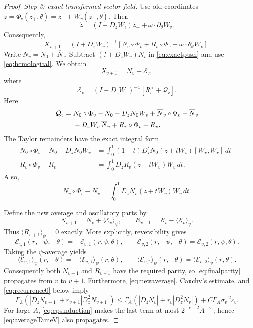 \documentclass[11pt]{amsart}
\theoremstyle{remark}
\newcommand{\eps}{\varepsilon}
\newcommand{\av}[1]{\langle #1\rangle}
\begin{document}
\begin{proof}
\smallskip
\noindent\emph{Step 3: exact transformed vector field.}
Use old coordinates $z=\Phi_v(z_+,\theta)=z_++W_v(z_+,\theta)$.
Then
\[
 \dot z=(I+D_zW_v)\dot z_+
       +\omega\cdot\partial_\theta W_v.
\]
Consequently,
\begin{equation}\label{eq:exactpush}
 X_{v+1}
 =(I+D_zW_v)^{-1}
 \left[
 N_v\circ\Phi_v+R_v\circ\Phi_v
 -\omega\cdot\partial_\theta W_v
 \right].
\end{equation}
Write $N_v=N_0+\overline N_v$.  Subtract
$(I+D_zW_v)N_v$ in \eqref{eq:exactpush} and use
\eqref{eq:homological}.  We obtain
\begin{equation}\label{eq:pushsplit}
 X_{v+1}
 =N_v+\mathcal E_v,
\end{equation}
where
\begin{equation}\label{eq:Ev}
 \mathcal E_v
 =(I+D_zW_v)^{-1}
 \left[
 R_v^>+\mathcal Q_v
 \right].
\end{equation}
Here
\begin{align}
 \mathcal Q_v={}&
 N_0\circ\Phi_v-N_0-D_zN_0W_v
 +\overline N_v\circ\Phi_v-\overline N_v
\notag\\
&-D_zW_v\,\overline N_v
 +R_v\circ\Phi_v-R_v .
\label{eq:Qv}
\end{align}
The Taylor remainders have the exact integral form
\begin{align}
 N_0\circ\Phi_v-N_0-D_zN_0W_v
 &=\int_0^1(1-t)
 D_z^2N_0(z+tW_v)[W_v,W_v]\,dt,
 \label{eq:TaylorN}\\
 R_v\circ\Phi_v-R_v
 &=\int_0^1
 D_zR_v(z+tW_v)W_v\,dt.
\label{eq:TaylorR}
\end{align}
Also,
\begin{equation}\label{eq:TaylorAverage}
 \overline N_v\circ\Phi_v-\overline N_v
 =\int_0^1D_z\overline N_v(z+tW_v)W_v\,dt.
\end{equation}

Define the new average and oscillatory parts by
\begin{equation}\label{eq:newaverage}
 N_{v+1}=N_v+\av{\mathcal E_v}_{\psi},\qquad
 R_{v+1}=\mathcal E_v-\av{\mathcal E_v}_{\psi}.
\end{equation}
Thus $\av{R_{v+1}}_{\psi}=0$ exactly.  More explicitly, reversibility gives
\[
 \mathcal E_{v,1}(r,-\psi,-\theta)
 =-\mathcal E_{v,1}(r,\psi,\theta),\qquad
 \mathcal E_{v,2}(r,-\psi,-\theta)
 = \mathcal E_{v,2}(r,\psi,\theta).
\]
Taking the $\psi$-average yields
\[
 \av{\mathcal E_{v,1}}_\psi(r,-\theta)
 =-\av{\mathcal E_{v,1}}_\psi(r,\theta),\qquad
 \av{\mathcal E_{v,2}}_\psi(r,-\theta)
 = \av{\mathcal E_{v,2}}_\psi(r,\theta).
\]
Consequently both $N_{v+1}$ and $R_{v+1}$ have the required parity, so
\eqref{eq:finalparity} propagates from $v$ to $v+1$.
Furthermore, \eqref{eq:newaverage}, Cauchy's estimate, and
\eqref{eq:recurrence0} below imply
\[
 \Gamma_A\left(
 |D_z\overline N_{v+1}|+
 r_{v+1}|D_z^2\overline N_{v+1}|
 \right)
 \leq
 \Gamma_A\left(
 |D_z\overline N_v|+
 r_v|D_z^2\overline N_v|
 \right)
 +C\Gamma_A\sigma_v^{-2}\eps_v .
\]
For large $A$, \eqref{eq:epsinduction} makes the last term at most
$2^{-v-2}A^{-\kappa_0}$; hence \eqref{eq:averageTameV} also propagates.


\end{proof}
\end{document}
